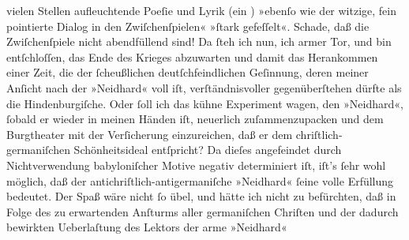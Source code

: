 \begin{ledgroupsized}[t]{13cm}
               vielen Stellen aufleuchtende Poeſie und Lyrik (ein \label{K_L02260_1v}\label{K_L02260_1h}) »ebenſo wie der witzige, fein pointierte Dialog in den
               Zwiſchenſpielen« »ſtark gefeſſelt«. Schade, daß die Zwiſchenſpiele nicht abendfüllend
               sind!\pend
           \pstart
           Da ſteh ich nun, ich armer Tor,
               und bin entſchloſſen, das Ende des Krieges abzuwarten und damit das Herankommen einer
               Zeit, die der ſcheußlichen deutſchfeindlichen Geſinnung, deren meiner Anſicht nach
               der »Neidhard« voll iſt, verſtändnisvoller
               gegenüberſtehen dürfte als die Hindenburgiſche.
               Oder ſoll ich das kühne Experiment wagen, den »Neidhard«, ſobald er wieder in meinen Händen iſt, neuerlich zuſammenzupacken
               und dem Burgtheater mit der Verſicherung
               einzureichen, daß er dem chriſtlich-germaniſchen Schönheitsideal entſpricht? Da
               dieſes angefeindet {\pb}durch Nichtverwendung babyloniſcher Motive negativ determiniert iſt, iſt’s
               ſehr wohl möglich, daß der antichriſtlich-antigermaniſche »Neidhard« ſeine volle Erfüllung bedeutet. Der Spaß wäre nicht ſo
               übel, und hätte ich nicht zu befürchten, daß in Folge des zu erwartenden Anſturms
               aller germaniſchen Chriſten und der dadurch bewirkten Ueberlaſtung des Lektors der
               arme »Neidhard« 

\end{ledgroupsized}
